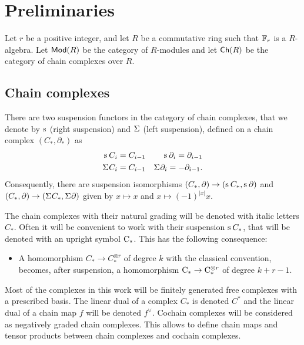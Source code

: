 
\section{Preliminaries}\label{s:preliminaries}

Let $r$ be a positive integer, and let $R$ be a commutative ring such that $\mathbb{F}_r$ is a $R$-algebra. Let $\mathsf{Mod}(R)$ be the category of $R$-modules and let $\mathsf{Ch}(R)$ be the category of chain complexes over $R$.

\subsection{Chain complexes} There are two suspension functors in the category of chain complexes, that we denote by $\operatorname{s}^{}$ (right suspension) and $\Sigma^{}$ (left suspension), defined on a chain complex $(C_*,\partial_*)$ as
\begin{align*}
	\operatorname{s}^{} C_i &= C_{i-1} & \operatorname{s}^{} \partial_i = \partial_{i-1} \\
	\Sigma^{} C_i &= C_{i-1} & \Sigma^{} \partial_i = -\partial_{i-1}. \\
\end{align*}
Consequently, there are suspension isomorphisms $(C_*,\partial)\to (\operatorname{s}^{} C_*,\operatorname{s}^{}\partial)$ and $(C_*,\partial)\to (\Sigma^{} C_*,\Sigma^{}\partial)$ given by $x\mapsto x$ and $x\mapsto (-1)^{|x|} x$.

\begin{convention}
	The chain complexes with their natural grading will be denoted with italic letters $C_*$. Often it will be convenient to work with their suspension $\operatorname{s}^{}C_*$, that will be denoted with an upright symbol $\mathrm{C}_*$. This has the following consequence:
	\begin{itemize}
		\item A homomorphism $C_*\to C_*^{\otimes r}$ of degree $k$ with the classical convention, becomes, after suspension, a homomorphism $\mathrm{C}_*\to \mathrm{C}_*^{\otimes r}$ of degree $k+r-1$.
	\end{itemize}
\end{convention}

Most of the complexes in this work will be finitely generated free complexes with a prescribed basis.
The linear dual of a complex $C_*$ is denoted $C^*$ and the linear dual of a chain map $f$ will be denoted $f^\vee$. Cochain complexes will be considered as negatively graded chain complexes. This allows to define chain maps and tensor products between chain complexes and cochain complexes.

